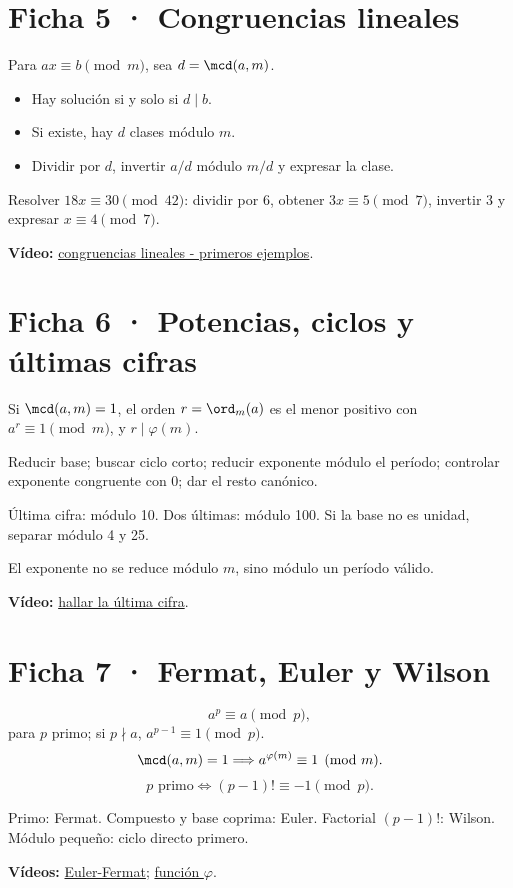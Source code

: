 \documentclass[10pt,a4paper,openany]{report}
\begin{document}
\section*{Ficha 5 · Congruencias lineales}
Para $ax\equiv b\pmod m$, sea $d=\mcd(a,m)$.
\begin{itemize}
\item Hay solución si y solo si $d\mid b$.
\item Si existe, hay $d$ clases módulo $m$.
\item Dividir por $d$, invertir $a/d$ módulo $m/d$ y expresar la clase.
\end{itemize}
\begin{procedimiento}
Resolver $18x\equiv30\pmod{42}$: dividir por 6, obtener $3x\equiv5\pmod7$, invertir 3 y expresar $x\equiv4\pmod7$.
\end{procedimiento}
\textbf{Vídeo:} \href{https://www.youtube.com/watch?v=uBgFI-cdS7o}{congruencias lineales - primeros ejemplos}.
\clearpage

\section*{Ficha 6 · Potencias, ciclos y últimas cifras}
Si $\mcd(a,m)=1$, el orden $r=\ord_m(a)$ es el menor positivo con $a^r\equiv1\pmod m$, y $r\mid\varphi(m)$.
\begin{ruta}
Reducir base; buscar ciclo corto; reducir exponente módulo el período; controlar exponente congruente con 0; dar el resto canónico.
\end{ruta}
Última cifra: módulo 10. Dos últimas: módulo 100. Si la base no es unidad, separar módulo 4 y 25.
\begin{alerta}El exponente no se reduce módulo $m$, sino módulo un período válido.\end{alerta}
\textbf{Vídeo:} \href{https://www.youtube.com/watch?v=a0Sdj8guoLY}{hallar la última cifra}.
\clearpage

\section*{Ficha 7 · Fermat, Euler y Wilson}
\[
a^p\equiv a\pmod p,
\]
para $p$ primo; si $p\nmid a$, $a^{p-1}\equiv1\pmod p$.
\[
\mcd(a,m)=1\Longrightarrow a^{\varphi(m)}\equiv1\pmod m.
\]
\[
p\text{ primo}\Longleftrightarrow(p-1)!\equiv-1\pmod p.
\]
\begin{ruta}
Primo: Fermat. Compuesto y base coprima: Euler. Factorial $(p-1)!$: Wilson. Módulo pequeño: ciclo directo primero.
\end{ruta}
\textbf{Vídeos:} \href{https://www.youtube.com/watch?v=aFSLQDmOKl0}{Euler-Fermat}; \href{https://www.youtube.com/watch?v=H1-8wPKNTNE}{función $\varphi$}.
\clearpage
\end{document}
